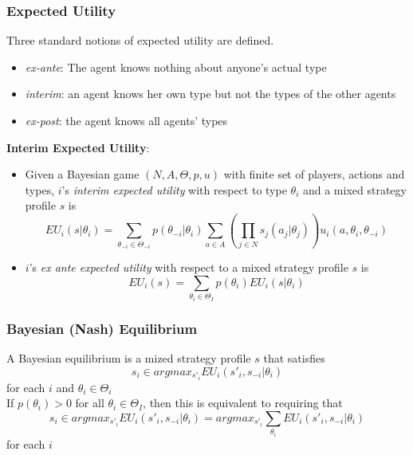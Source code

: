 \subsubsection{Expected Utility}
Three standard notions of expected utility are defined.
\begin{itemize}
\item \textit{ex-ante}: The agent knows nothing about anyone's actual type
\item \textit{interim}: an agent knows her own type but not the types of the other agents
\item \textit{ex-post}: the agent knows all agents' types
\end{itemize}
\textbf{Interim Expected Utility}:\\
\begin{itemize}
\item Given a Bayesian game $(N, A, \Theta, p, u)$ with finite set of players, actions and types, $i$'s \textit{interim expected utility} with respect to type $\theta_i$ and a mixed strategy profile $s$ is $$EU_i(s|\theta_i) = \sum_{\theta_{-i} \in \Theta_{-i}}p(\theta_{-i}| \theta_i) \sum_{a \in A}(\prod_{j\in N}s_j(a_j|\theta_j))u_i(a, \theta_i, \theta_{-i})$$
\item $i$'s \textit{ex ante expected utility} with respect to a mixed strategy profile $s$ is $$EU_i(s) = \sum_{\theta_i \in \Theta_I}p(\theta_i)EU_i(s|\theta_i)$$
\end{itemize}
\subsubsection{Bayesian (Nash) Equilibrium}
A Bayesian equilibrium is a mized strategy profile $s$ that satisfies $$s_i \in argmax_{s'_i}EU_i(s'_i,s_{-i}|\theta_i)$$ for each $i$ and $\theta_i \in \Theta_i$\\
If $p(\theta_i)>0$ for all $\theta_i \in \Theta_I$, then this is equivalent to requiring that $$s_i \in argmax_{s'_i}EU_i(s'_i,s_{-i}|\theta_i) = argmax_{s'_i} \sum_{\theta_i}EU_i(s'_i, s_{-i}|\theta_i)$$ for each $i$
